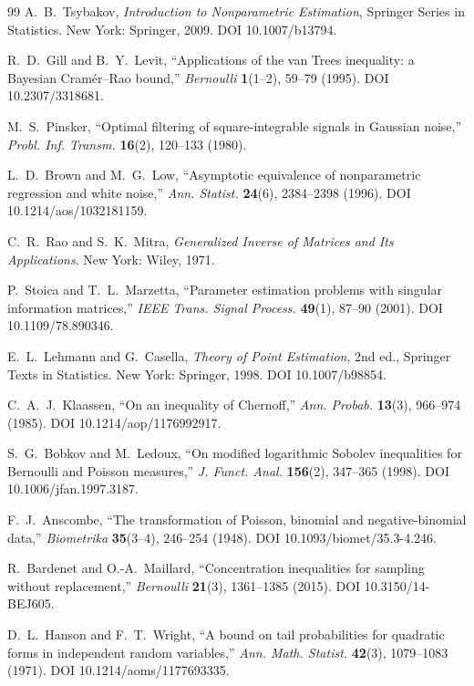 \begin{thebibliography}{99}
A.~B.~Tsybakov, \emph{Introduction to Nonparametric Estimation}, Springer Series in Statistics. New York: Springer, 2009. DOI 10.1007/b13794.

R.~D.~Gill and B.~Y.~Levit, ``Applications of the van Trees inequality: a Bayesian Cram\'er--Rao bound,'' \emph{Bernoulli} \textbf{1}(1--2), 59--79 (1995). DOI 10.2307/3318681.

M.~S.~Pinsker, ``Optimal filtering of square-integrable signals in Gaussian noise,'' \emph{Probl. Inf. Transm.} \textbf{16}(2), 120--133 (1980).

L.~D.~Brown and M.~G.~Low, ``Asymptotic equivalence of nonparametric regression and white noise,'' \emph{Ann. Statist.} \textbf{24}(6), 2384--2398 (1996). DOI 10.1214/aos/1032181159.

C.~R.~Rao and S.~K.~Mitra, \emph{Generalized Inverse of Matrices and Its Applications}. New York: Wiley, 1971.

P.~Stoica and T.~L.~Marzetta, ``Parameter estimation problems with singular information matrices,'' \emph{IEEE Trans. Signal Process.} \textbf{49}(1), 87--90 (2001). DOI 10.1109/78.890346.

E.~L.~Lehmann and G.~Casella, \emph{Theory of Point Estimation}, 2nd ed., Springer Texts in Statistics. New York: Springer, 1998. DOI 10.1007/b98854.

C.~A.~J.~Klaassen, ``On an inequality of Chernoff,'' \emph{Ann. Probab.} \textbf{13}(3), 966--974 (1985). DOI 10.1214/aop/1176992917.

S.~G.~Bobkov and M.~Ledoux, ``On modified logarithmic Sobolev inequalities for Bernoulli and Poisson measures,'' \emph{J. Funct. Anal.} \textbf{156}(2), 347--365 (1998). DOI 10.1006/jfan.1997.3187.

F.~J.~Anscombe, ``The transformation of Poisson, binomial and negative-binomial data,'' \emph{Biometrika} \textbf{35}(3--4), 246--254 (1948). DOI 10.1093/biomet/35.3-4.246.

R.~Bardenet and O.-A.~Maillard, ``Concentration inequalities for sampling without replacement,'' \emph{Bernoulli} \textbf{21}(3), 1361--1385 (2015). DOI 10.3150/14-BEJ605.

D.~L.~Hanson and F.~T.~Wright, ``A bound on tail probabilities for quadratic forms in independent random variables,'' \emph{Ann. Math. Statist.} \textbf{42}(3), 1079--1083 (1971). DOI 10.1214/aoms/1177693335.


\end{thebibliography}
